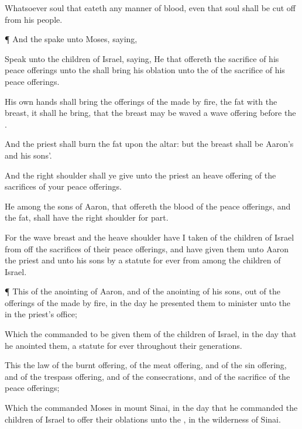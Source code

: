 {Whatsoever
soul
{} that
eateth any
manner of
blood, even that
soul shall be cut
off from his
people.


\par }{\PP {}¶ And the
{}
spake unto
Moses,
saying,

Speak unto the
children of
Israel,
saying, He that
offereth the
sacrifice of his peace
offerings unto the
{} shall
bring his
oblation unto the
{} of the
sacrifice of his peace
offerings.

His own
hands shall
bring the
offerings of the
{} made by
fire, the
fat with the
breast, it shall he
bring, that the
breast may be
waved
{} a wave
offering
before the
{}.

And the
priest shall
burn the
fat upon the
altar: but the
breast shall be
Aaron’s and his
sons’.

And the
right
shoulder shall ye
give unto the
priest
{} an heave
offering of the
sacrifices of your peace
offerings.

He among the
sons of
Aaron, that
offereth the
blood of the peace
offerings, and the
fat, shall have the
right
shoulder for
{}
part.

For the
wave
breast and the
heave
shoulder have I
taken of the
children of
Israel from off the
sacrifices of their peace
offerings, and have
given them unto
Aaron the
priest and unto his
sons by a
statute for
ever from among the
children of
Israel.


\par }{\PP {}¶ This
{} of the
anointing of
Aaron, and of the
anointing of his
sons, out of the
offerings of the
{} made by
fire, in the
day
{} he
presented them to minister unto the
{} in the
priest’s office;

Which the
{}
commanded to be
given them of the
children of
Israel, in the
day that he
anointed them,
{} a
statute for
ever throughout their
generations.

This
{} the
law of the burnt
offering, of the meat
offering, and of the sin
offering, and of the trespass
offering, and of the
consecrations, and of the
sacrifice of the peace
offerings;

Which the
{}
commanded
Moses in
mount
Sinai, in the
day that he
commanded the
children of
Israel to
offer their
oblations unto the
{}, in the
wilderness of
Sinai.




}
